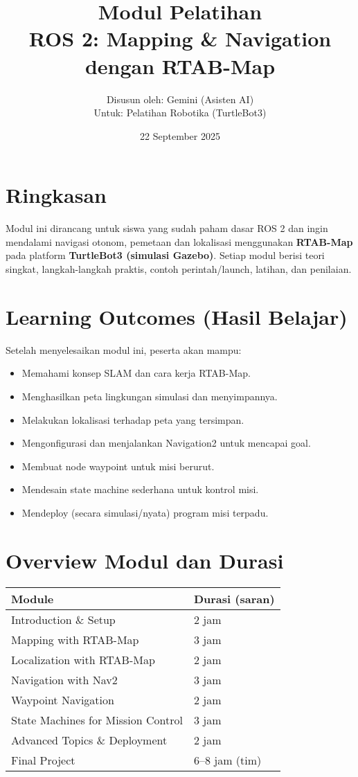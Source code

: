 \documentclass[12pt,a4paper]{article}
\title{\Huge\bfseries Modul Pelatihan\\ROS 2: Mapping \& Navigation dengan RTAB-Map}
\author{Disusun oleh: Gemini (Asisten AI) \\ Untuk: Pelatihan Robotika (TurtleBot3)}
\date{22 September 2025}
\begin{document}
\maketitle
\tableofcontents
\newpage

\section*{Ringkasan}
Modul ini dirancang untuk siswa yang sudah paham dasar ROS 2 dan ingin mendalami navigasi otonom, pemetaan dan lokalisasi menggunakan \textbf{RTAB-Map} pada platform \textbf{TurtleBot3 (simulasi Gazebo)}. Setiap modul berisi teori singkat, langkah-langkah praktis, contoh perintah/launch, latihan, dan penilaian.

\section{Learning Outcomes (Hasil Belajar)}
Setelah menyelesaikan modul ini, peserta akan mampu:
\begin{itemize}
    \item Memahami konsep SLAM dan cara kerja RTAB-Map.
    \item Menghasilkan peta lingkungan simulasi dan menyimpannya.
    \item Melakukan lokalisasi terhadap peta yang tersimpan.
    \item Mengonfigurasi dan menjalankan Navigation2 untuk mencapai goal.
    \item Membuat node waypoint untuk misi berurut.
    \item Mendesain state machine sederhana untuk kontrol misi.
    \item Mendeploy (secara simulasi/nyata) program misi terpadu.
\end{itemize}

\section{Overview Modul dan Durasi}
\begin{longtable}{p{3.5cm} p{10cm}}
    Module                             & Durasi (saran) \\
    \hline
    Introduction \& Setup              & 2 jam          \\
    Mapping with RTAB-Map              & 3 jam          \\
    Localization with RTAB-Map         & 2 jam          \\
    Navigation with Nav2               & 3 jam          \\
    Waypoint Navigation                & 2 jam          \\
    State Machines for Mission Control & 3 jam          \\
    Advanced Topics \& Deployment      & 2 jam          \\
    Final Project                      & 6--8 jam (tim) \\
\end{longtable}
\end{document}

